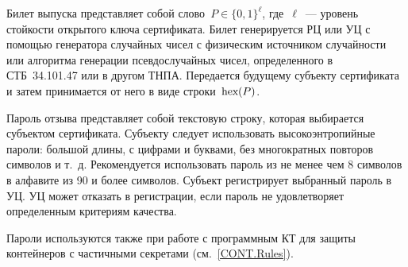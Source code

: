 Билет выпуска представляет собой слово~$P\in\{0,1\}^\ell$,
где~$\ell$~--- уровень стойкости открытого ключа сертификата.
%
Билет генерируется РЦ или УЦ с помощью генератора случайных чисел 
с физическим источником случайности или алгоритма генерации псевдослучайных 
чисел, определенного в СТБ~34.101.47 или в другом ТНПА.
%
Передается будущему субъекту сертификата и затем принимается от него
в виде строки~$\code{hex}(P)$. 

Пароль отзыва представляет собой текстовую строку, которая выбирается 
субъектом сертификата. Субъекту следует использовать  
высокоэнтропийные пароли: большой длины, с цифрами и буквами, 
без многократных повторов символов и т.~д.
%
Рекомендуется использовать пароль из не менее чем 8 символов в алфавите из 
90 и более символов.
%
Субъект регистрирует выбранный пароль в УЦ. УЦ может отказать в регистрации, 
если пароль не удовлетворяет определенным критериям качества. 

Пароли используются также при работе с программным КТ для защиты 
контейнеров с частичными секретами (см.~\ref{CONT.Rules}).

